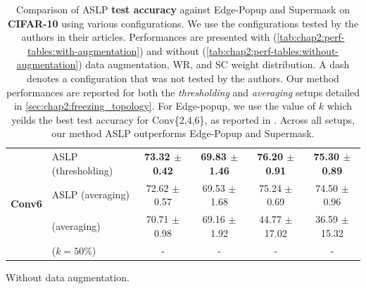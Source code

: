\begin{table}[htbp]
\begin{subtable}[t]{\textwidth}
{\begin{tabular}{llcccc}
        \midrule
        \multirow{4}{*}{\textbf{Conv6}}                    & \ac{ASLP} (thresholding)                              & \textbf{73.32 $\pm$ 0.42} & \textbf{69.83 $\pm$ 1.46}  & \textbf{76.20 $\pm$ 0.91} & \textbf{75.30 $\pm$ 0.89} \\
                                                           & \ac{ASLP} (averaging)                                 & 72.62 $\pm$ 0.57          & 69.53 $\pm$ 1.68           & 75.24 $\pm$ 0.69          & 74.50 $\pm$ 0.96          \\
                                                           & \cite{DBLP:conf/nips/ZhouLLY19} (averaging)      & 70.71 $\pm$ 0.98          & 69.16 $\pm$ 1.92           & 44.77 $\pm$ 17.02         & 36.59 $\pm$ 15.32         \\
                                                           & \cite{DBLP:conf/cvpr/RamanujanWKFR20} ($k=50\%$) & -                         & -                          & -                         & -                         \\
        \bottomrule
      \end{tabular}
    }
    \caption{Without data augmentation.}
    \label{tab:chap2:perf-tables:without-augmentation}
  \end{subtable}
  \caption{Comparison of \ac{ASLP} \textbf{test accuracy} against Edge-Popup and Supermask
    \cite{DBLP:conf/cvpr/RamanujanWKFR20,DBLP:conf/nips/ZhouLLY19} on \textbf{CIFAR-10}
    using various configurations. We use the configurations tested by the
    authors in their articles. Performances are presented with
    (\cref{tab:chap2:perf-tables:with-augmentation}) and without
    (\cref{tab:chap2:perf-tables:without-augmentation}) data augmentation,
    \acf{WR}, and \acf{SC} weight distribution. A dash denotes a configuration
    that was not tested by the authors. Our method performances are reported for
    both the \textit{thresholding} and \textit{averaging} setups detailed in
    \cref{sec:chap2:freezing_topology}. For Edge-popup, we use the value of $k$
    which yeilds the best test accuracy for Conv\{2,4,6\}, as reported in
    \cite{DBLP:conf/cvpr/RamanujanWKFR20}. Across all setups, our method ASLP
    outperforms Edge-Popup and Supermask.}
  \label{tab:chap2:con_performances_comparison_cifar10}

\end{table}


